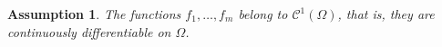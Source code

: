 \documentclass[11pt]{article}
\newtheorem{assumption}{Assumption}
\begin{document}


\begin{assumption} \label{a1}
The functions $f_1, \ldots, f_m$ belong to $\mathcal{C}^1(\Omega)$, 
that is, they are continuously differentiable on $\Omega$.
\end{assumption}
\end{document}
